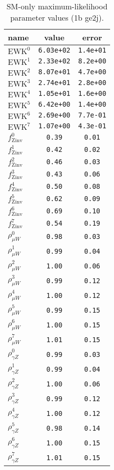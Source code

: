 %

\begin{table}\centering
\caption{SM-only maximum-likelihood parameter values (1b ge2j).}
\label{tab:mlParameterValues1b_ge2j}
\begin{tabular}{lcc}name & value & error \\ \hline
$\mathrm{EWK}^{0}$ & {\tt  6.03e+02} & {\tt  1.4e+01}\\
$\mathrm{EWK}^{1}$ & {\tt  2.33e+02} & {\tt  8.2e+00}\\
$\mathrm{EWK}^{2}$ & {\tt  8.07e+01} & {\tt  4.7e+00}\\
$\mathrm{EWK}^{3}$ & {\tt  2.74e+01} & {\tt  2.8e+00}\\
$\mathrm{EWK}^{4}$ & {\tt  1.05e+01} & {\tt  1.6e+00}\\
$\mathrm{EWK}^{5}$ & {\tt  6.42e+00} & {\tt  1.4e+00}\\
$\mathrm{EWK}^{6}$ & {\tt  2.69e+00} & {\tt  7.7e-01}\\
$\mathrm{EWK}^{7}$ & {\tt  1.07e+00} & {\tt  4.3e-01}\\
$f_\mathrm{Zinv}^{0}$ & {\tt 0.39} & {\tt 0.01}\\
$f_\mathrm{Zinv}^{1}$ & {\tt 0.42} & {\tt 0.02}\\
$f_\mathrm{Zinv}^{2}$ & {\tt 0.46} & {\tt 0.03}\\
$f_\mathrm{Zinv}^{3}$ & {\tt 0.43} & {\tt 0.06}\\
$f_\mathrm{Zinv}^{4}$ & {\tt 0.50} & {\tt 0.08}\\
$f_\mathrm{Zinv}^{5}$ & {\tt 0.62} & {\tt 0.09}\\
$f_\mathrm{Zinv}^{6}$ & {\tt 0.69} & {\tt 0.10}\\
$f_\mathrm{Zinv}^{7}$ & {\tt 0.54} & {\tt 0.19}\\
$\rho_{\mu W}^{0}$ & {\tt 0.98} & {\tt 0.03}\\
$\rho_{\mu W}^{1}$ & {\tt 0.99} & {\tt 0.04}\\
$\rho_{\mu W}^{2}$ & {\tt 1.00} & {\tt 0.06}\\
$\rho_{\mu W}^{3}$ & {\tt 0.99} & {\tt 0.12}\\
$\rho_{\mu W}^{4}$ & {\tt 1.00} & {\tt 0.12}\\
$\rho_{\mu W}^{5}$ & {\tt 0.99} & {\tt 0.15}\\
$\rho_{\mu W}^{6}$ & {\tt 1.00} & {\tt 0.15}\\
$\rho_{\mu W}^{7}$ & {\tt 1.01} & {\tt 0.15}\\
$\rho_{\gamma Z}^{0}$ & {\tt 0.99} & {\tt 0.03}\\
$\rho_{\gamma Z}^{1}$ & {\tt 0.99} & {\tt 0.04}\\
$\rho_{\gamma Z}^{2}$ & {\tt 1.00} & {\tt 0.06}\\
$\rho_{\gamma Z}^{3}$ & {\tt 0.99} & {\tt 0.12}\\
$\rho_{\gamma Z}^{4}$ & {\tt 1.00} & {\tt 0.12}\\
$\rho_{\gamma Z}^{5}$ & {\tt 0.98} & {\tt 0.14}\\
$\rho_{\gamma Z}^{6}$ & {\tt 1.00} & {\tt 0.15}\\
$\rho_{\gamma Z}^{7}$ & {\tt 1.01} & {\tt 0.15}\\
\hline
\end{tabular}
\end{table}
%